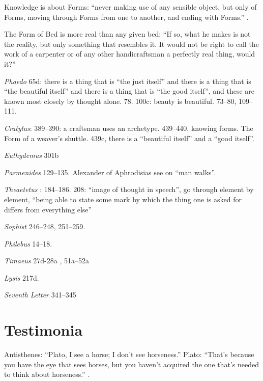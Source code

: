 \documentclass{article}
\theoremstyle{definition}
\begin{document}
Knowledge is about Forms: ``never making use of any sensible object, but only of Forms, moving through
Forms from one to another, and ending with Forms.'' \cite[p.~226, 511--512]{cornfordrepublic}.

The Form of Bed is more real than any given bed: ``If so, what he makes is not the reality, but only something that resembles it. It would
not be right to call the work of a carpenter or of any other handicraftsman a perfectly real thing, would it?'' \cite[p.~326, 596--597]{cornfordrepublic}

{\em Phaedo} 65d: there is a thing that is ``the just itself'' and there is a thing that is ``the beautiful itself'' and there is a thing that is ``the good itself'', and these are
known most closely by thought alone. 78. 100c: beauty is beautiful. 73--80, 109--111.

{\em Cratylus}: 389--390: a craftsman uses an archetype. 439--440, knowing forms. The Form of a weaver's shuttle. 439c, there is a ``beautiful itself'' and a ``good itself''. 

{\em Euthydemus} 301b

{\em Parmenides} \cite{cornfordparmenides} 129--135. Alexander of Aphrodisias see \cite[p.~88]{cornfordparmenides} on ``man walks''.

{\em Theaetetus} \cite[p.~162]{cornfordtheaetetus}: 184--186. 208: ``image of thought in speech'', go through element by element,
``being able to state some mark by which the thing one is asked for differs from everything else''

{\em Sophist} \cite{cornfordtheaetetus} 246--248, 251--259.

{\em Philebus} 14--18. 

{\em Timaeus} \cite{cornfordtimaeus} 27d-28a  \cite[pp.~21--22]{cornfordtimaeus}, 51a--52a \cite[pp.~188--193]{cornfordtimaeus}

{\em Lysis} 217d.

{\em Seventh Letter} 341--345








\section{Testimonia}
Antisthenes: ``Plato, I see a horse; I don't see horseness.'' Plato: ``That's because you have the eye
that sees horses, but you haven't acquired the one that's needed to think about horseness.'' \cite[p.~296, 11.6]{socratics}.
\end{document}
